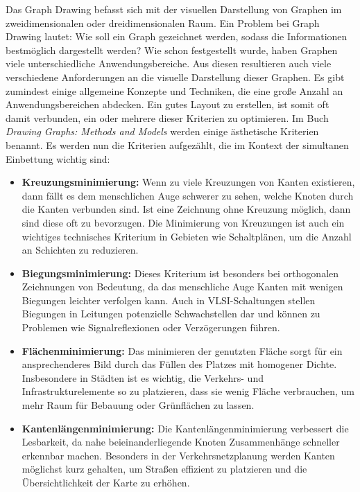 \documentclass[bachelor, german]{algothesis}
\begin{document}
Das Graph Drawing befasst sich mit der visuellen Darstellung von Graphen im zweidimensionalen oder dreidimensionalen Raum. Ein Problem bei Graph Drawing lautet: Wie soll ein Graph gezeichnet werden, sodass die Informationen bestmöglich dargestellt werden? Wie schon festgestellt wurde, haben Graphen viele unterschiedliche Anwendungsbereiche. Aus diesen resultieren auch viele verschiedene Anforderungen an die visuelle Darstellung dieser Graphen.\newline
Es gibt zumindest einige allgemeine Konzepte und Techniken, die eine große Anzahl an Anwendungsbereichen abdecken. Ein gutes Layout zu erstellen, ist somit oft damit verbunden, ein oder mehrere dieser Kriterien zu optimieren. Im Buch \textit{Drawing Graphs: Methods and Models} \cite{DrawingMeth} werden einige ästhetische Kriterien benannt. Es werden nun die Kriterien aufgezählt, die im Kontext der simultanen Einbettung wichtig sind: 
\begin{itemize}
    \item  \textbf{Kreuzungsminimierung:} Wenn zu viele Kreuzungen von Kanten existieren, dann fällt es dem menschlichen Auge schwerer zu sehen, welche Knoten durch die Kanten verbunden sind. Ist eine Zeichnung ohne Kreuzung möglich, dann sind diese oft zu bevorzugen. Die Minimierung von Kreuzungen ist auch ein wichtiges technisches Kriterium in Gebieten wie Schaltplänen, um die Anzahl an Schichten zu reduzieren.
    \item  \textbf{Biegungsminimierung:} Dieses Kriterium ist besonders bei orthogonalen Zeichnungen von Bedeutung, da das menschliche Auge Kanten mit wenigen Biegungen leichter verfolgen kann. Auch in VLSI-Schaltungen stellen Biegungen in Leitungen potenzielle Schwachstellen dar und können zu Problemen wie Signalreflexionen oder Verzögerungen führen.
    \item  \textbf{Flächenminimierung:} Das minimieren der genutzten Fläche sorgt für ein ansprechenderes Bild durch das Füllen des Platzes mit homogener Dichte. Insbesondere in Städten ist es wichtig, die Verkehrs- und Infrastrukturelemente so zu platzieren, dass sie wenig Fläche verbrauchen, um mehr Raum für Bebauung oder Grünflächen zu lassen.
    \item  \textbf{Kantenlängenminimierung:} Die Kantenlängenminimierung verbessert die Lesbarkeit, da nahe beieinanderliegende Knoten Zusammenhänge schneller erkennbar machen. Besonders in der Verkehrsnetzplanung werden Kanten möglichst kurz gehalten, um Straßen effizient zu platzieren und die Übersichtlichkeit der Karte zu erhöhen.
\end{itemize}
\end{document}
